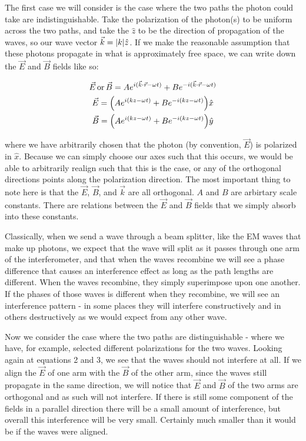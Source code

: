 \documentclass{article}
\DeclarePairedDelimiter\abs{\lvert}{\rvert}%
\DeclarePairedDelimiter{\parens}{\lparen}{\rparen}
\begin{document}
	\hspace{.25cm}

	The first case we will consider is the case where the two paths the photon could take are indistinguishable.  Take the polarization of the photon(s) to be uniform across the two paths, and take the $\hat{z}$ to be the direction of propagation of the waves, so our wave vector $\vec{k} = \abs{k}\hat{z}$.  If we make the reasonable assumption that these photons propagate in what is approximately free space, we can write down the $\vec{E}$ and $\vec{B}$ fields like so:

	\begin{gather}
		\vec{E} \, \text{or} \, \vec{B} = Ae^{i(\vec{k} \cdot \vec{r} - \omega t)} + Be^{-i(\vec{k} \cdot \vec{r} - \omega t)}\\
		\vec{E} = \parens*{Ae^{i(kz-\omega t)} + Be^{-i(kz-\omega t)}}\hat{x}\\
		\vec{B} = \parens*{Ae^{i(kz-\omega t)} + Be^{-i(kz-\omega t)}}\hat{y}
	\end{gather}

	where we have arbitrarily chosen that the photon (by convention, $\vec{E}$) is polarized in $\hat{x}$.  Because we can simply choose our axes such that this occurs, we would be able to arbitrarily realign such that this is the case, or any of the orthogonal directions points along the polarization direction.  The most important thing to note here is that the $\vec{E}$, $\vec{B}$, and $\vec{k}$ are all orthogonal.  $A$ and $B$ are arbirtary scale constants.  There are relations between the $\vec{E}$ and $\vec{B}$ fields that we simply absorb into these constants.

	\hspace{.25cm}

	Classically, when we send a wave through a beam splitter, like the EM waves that make up photons, we expect that the wave will split as it passes through one arm of the interferometer, and that when the waves recombine we will see a phase difference that causes an interference effect as long as the path lengths are different.  When the waves recombine, they simply superimpose upon one another.  If the phases of those waves is different when they recombine, we will see an interference pattern - in some places they will interfere constructively and in others destructively as we would expect from any other wave.

	\hspace{.25cm}

	Now we consider the case where the two paths are distinguishable - where we have, for example, selected different polarizations for the two waves.  Looking again at equations 2 and 3, we see that the waves should not interfere at all.  If we align the $\vec{E}$ of one arm with the $\vec{B}$ of the other arm, since the waves still propagate in the same direction, we will notice that $\vec{E}$ and $\vec{B}$ of the two arms are orthogonal and as such will not interfere.  If there is still some component of the fields in a parallel direction there will be a small amount of interference, but overall this interference will be very small.  Certainly much smaller than it would be if the waves were aligned.
\end{document}
